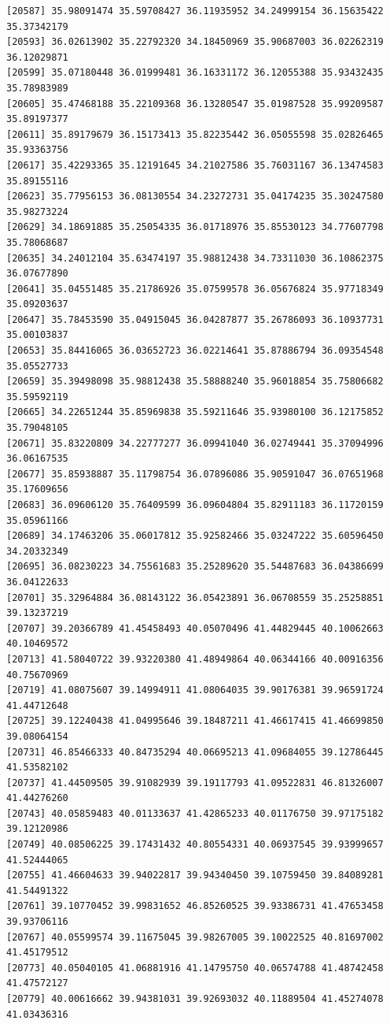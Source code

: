 \documentclass[
  letterpaper,
  DIV=11,
  numbers=noendperiod]{scrartcl}
\begin{document}
\begin{verbatim}
[20587] 35.98091474 35.59708427 36.11935952 34.24999154 36.15635422 35.37342179
[20593] 36.02613902 35.22792320 34.18450969 35.90687003 36.02262319 36.12029871
[20599] 35.07180448 36.01999481 36.16331172 36.12055388 35.93432435 35.78983989
[20605] 35.47468188 35.22109368 36.13280547 35.01987528 35.99209587 35.89197377
[20611] 35.89179679 36.15173413 35.82235442 36.05055598 35.02826465 35.93363756
[20617] 35.42293365 35.12191645 34.21027586 35.76031167 36.13474583 35.89155116
[20623] 35.77956153 36.08130554 34.23272731 35.04174235 35.30247580 35.98273224
[20629] 34.18691885 35.25054335 36.01718976 35.85530123 34.77607798 35.78068687
[20635] 34.24012104 35.63474197 35.98812438 34.73311030 36.10862375 36.07677890
[20641] 35.04551485 35.21786926 35.07599578 36.05676824 35.97718349 35.09203637
[20647] 35.78453590 35.04915045 36.04287877 35.26786093 36.10937731 35.00103837
[20653] 35.84416065 36.03652723 36.02214641 35.87886794 36.09354548 35.05527733
[20659] 35.39498098 35.98812438 35.58888240 35.96018854 35.75806682 35.59592119
[20665] 34.22651244 35.85969838 35.59211646 35.93980100 36.12175852 35.79048105
[20671] 35.83220809 34.22777277 36.09941040 36.02749441 35.37094996 36.06167535
[20677] 35.85938887 35.11798754 36.07896086 35.90591047 36.07651968 35.17609656
[20683] 36.09606120 35.76409599 36.09604804 35.82911183 36.11720159 35.05961166
[20689] 34.17463206 35.06017812 35.92582466 35.03247222 35.60596450 34.20332349
[20695] 36.08230223 34.75561683 35.25289620 35.54487683 36.04386699 36.04122633
[20701] 35.32964884 36.08143122 36.05423891 36.06708559 35.25258851 39.13237219
[20707] 39.20366789 41.45458493 40.05070496 41.44829445 40.10062663 40.10469572
[20713] 41.58040722 39.93220380 41.48949864 40.06344166 40.00916356 40.75670969
[20719] 41.08075607 39.14994911 41.08064035 39.90176381 39.96591724 41.44712648
[20725] 39.12240438 41.04995646 39.18487211 41.46617415 41.46699850 39.08064154
[20731] 46.85466333 40.84735294 40.06695213 41.09684055 39.12786445 41.53582102
[20737] 41.44509505 39.91082939 39.19117793 41.09522831 46.81326007 41.44276260
[20743] 40.05859483 40.01133637 41.42865233 40.01176750 39.97175182 39.12120986
[20749] 40.08506225 39.17431432 40.80554331 40.06937545 39.93999657 41.52444065
[20755] 41.46604633 39.94022817 39.94340450 39.10759450 39.84089281 41.54491322
[20761] 39.10770452 39.99831652 46.85260525 39.93386731 41.47653458 39.93706116
[20767] 40.05599574 39.11675045 39.98267005 39.10022525 40.81697002 41.45179512
[20773] 40.05040105 41.06881916 41.14795750 40.06574788 41.48742458 41.47572127
[20779] 40.00616662 39.94381031 39.92693032 40.11889504 41.45274078 41.03436316

\end{verbatim}
\end{document}
